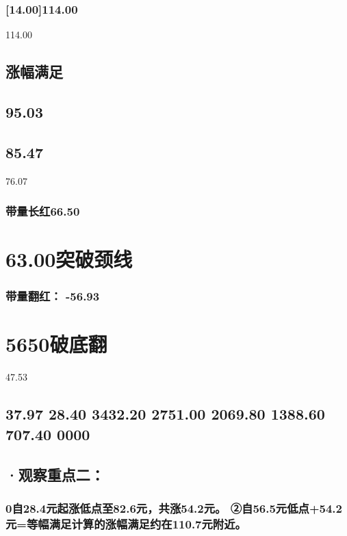 \documentclass{article}
\begin{document}
\subsubsection{[14.00]114.00}

114.00

\subsection{涨幅满足}

\subsection{95.03}

\subsection{85.47}

76.07

\subsubsection{带量长红66.50}

\section{63.00突破颈线}

\subsubsection{带量翻红： -56.93}

\section{5650破底翻}

47.53

\subsection{37.97 28.40 3432.20 2751.00 2069.80 1388.60 707.40 0000}

\subsection{·观察重点二：}

\subsubsection{0自28.4元起涨低点至82.6元，共涨54.2元。 ②自56.5元低点+54.2元=等幅满足计算的涨幅满足约在110.7元附近。}
\end{document}
